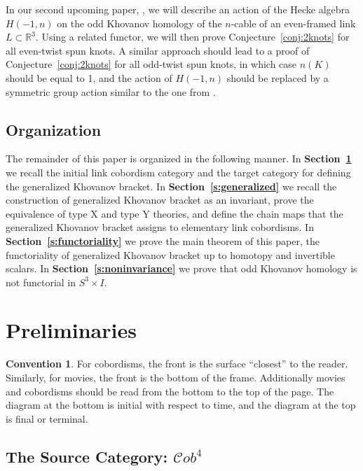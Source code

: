 \documentclass[12pt]{amsart}
\theoremstyle{definition}
\newtheorem{convention}{Convention}
\theoremstyle{plain}
\newcommand{\cobIV}{\mathcal{C}ob^4}
\begin{document}
In our second upcoming paper, \cite{MW2024b}, we will describe an action of the Hecke algebra $H(-1,n)$
on the odd Khovanov homology of the $n$-cable of an even-framed link $L\subset\mathbb{R}^3$.
Using a related functor, we will then prove Conjecture~\ref{conj:2knots} for all
even-twist spun knots.
A similar approach should lead to a proof of Conjecture~\ref{conj:2knots} for all odd-twist spun knots, in which case
$n(K)$ should be equal to 1, and the action of $H(-1,n)$ should be replaced
by a symmetric group action similar to the one from \cite{GLW2017}.

\subsection{Organization}

The remainder of this paper is organized in the following manner.  
In \textbf{Section~\ref{s:preliminaries}} we recall the initial link cobordism category and the target category for defining the generalized Khovanov bracket.  
In \textbf{Section~\ref{s:generalized}} we recall the construction of generalized Khovanov bracket as an invariant, prove the equivalence of type X and type Y theories, and define the chain maps that the generalized Khovanov bracket assigns to elementary link cobordisms.  
In \textbf{Section~\ref{s:functoriality}} we prove the main theorem of this paper, the functoriality of generalized Khovanov bracket up to
homotopy and invertible scalars.  
In \textbf{Section~\ref{s:noninvariance}} we prove that odd Khovanov homology is not functorial in $S^3\times I$.

\section{Preliminaries}\label{s:preliminaries}

\begin{convention}
	For cobordisms, the front is the surface \enquote{closest} to the reader.  Similarly, for movies, the front is the bottom of the frame.  Additionally movies and cobordisms should be read from the bottom to the top of the page.  The diagram at the bottom is initial with respect to time, and the diagram at the top is final or terminal.
\end{convention}

\subsection{The Source Category: $\cobIV$}
\end{document}
